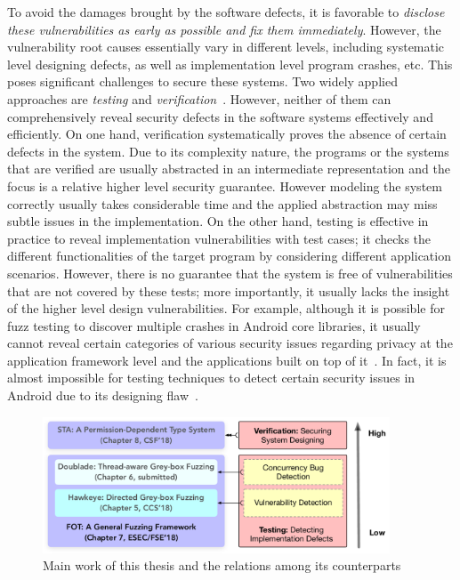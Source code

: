 To avoid the damages brought by the software defects, it is favorable to \emph{disclose these vulnerabilities as early as possible and fix them immediately}. However, the vulnerability root causes essentially vary in different levels, including systematic level designing defects, as well as implementation level program crashes, etc. This poses significant challenges to secure these systems. Two widely applied approaches are \emph{testing} and \emph{verification}~\cite{Hailpern:2002:SDT:1660992.1660994,Felderer:2016:MST:2904681.2904685,mc-at}. However, neither of them can comprehensively reveal security defects in the software systems effectively and efficiently. On one hand, verification systematically proves the absence of certain defects in the system. Due to its complexity nature, the programs or the systems that are verified are usually abstracted in an intermediate representation and the focus is a relative higher level security guarantee. However modeling the system correctly usually takes considerable time and the applied abstraction may miss subtle issues in the implementation. On the other hand, testing is effective in practice to reveal implementation vulnerabilities with test cases; it checks the different functionalities of the target program by considering different application scenarios. However, there is no guarantee that the system is free of vulnerabilities that are not covered by these tests; more importantly, it usually lacks the insight of the higher level design vulnerabilities. For example, although it is possible for fuzz testing to discover multiple crashes in Android core libraries, it usually cannot reveal certain categories of various security issues regarding privacy at the application framework level and the applications built on top of it~\cite{Enck:2009:UAS:1512148.1512324,Ernst:2014}. In fact, it is almost impossible for testing techniques to detect certain security issues in Android due to its designing flaw~\cite{url:android-flaw}.

\begin{figure}[t]
	\begin{center}
		\includegraphics[width=0.92\textwidth]{res/contributions}
		\caption{Main work of this thesis and the relations among its counterparts}
		\label{fig:works}
	\end{center}
\end{figure}


